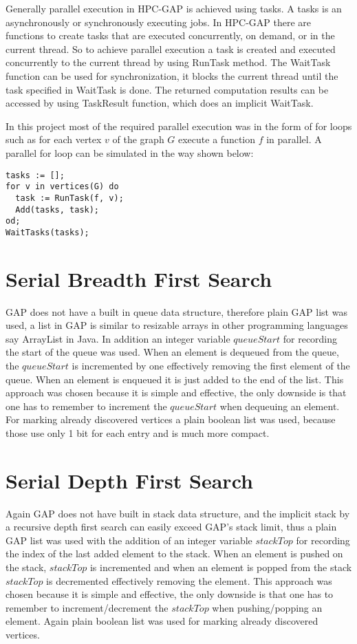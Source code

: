 \documentclass{report}
\theoremstyle{plain}
\theoremstyle{definition}
\theoremstyle{remark}
\begin{document}
Generally parallel execution in HPC-GAP is achieved using tasks. A tasks is an asynchronously or synchronously executing jobs. In HPC-GAP there are functions to create tasks that are executed concurrently, on demand, or in the current thread. So to achieve parallel execution a task is created and executed concurrently to the current thread by using RunTask method. The WaitTask function can be used for synchronization, it blocks the current thread until the task specified in WaitTask is done. The returned computation results can be accessed by using TaskResult function, which does an implicit WaitTask.

In this project most of the required parallel execution was in the form of for loops such as for each vertex $v$ of the graph $G$ execute a function $f$ in parallel. A parallel for loop can be simulated in the way shown below:

\begin{lstlisting}
tasks := [];
for v in vertices(G) do
  task := RunTask(f, v);
  Add(tasks, task);
od;
WaitTasks(tasks);
\end{lstlisting}

\section{Serial Breadth First Search}

GAP does not have a built in queue data structure, therefore plain GAP list was used, a list in GAP is similar to resizable arrays in other programming languages say ArrayList in Java. In addition an integer variable $queueStart$ for recording the start of the queue was used. When an element is dequeued from the queue, the $queueStart$ is incremented by one effectively removing the first element of the queue. When an element is enqueued it is just added to the end of the list. This approach was chosen because it is simple and effective, the only downside is that one has to remember to increment the $queueStart$ when dequeuing an element. For marking already discovered vertices a plain boolean list was used, because those use only 1 bit for each entry and is much more compact.

\section{Serial Depth First Search}

Again GAP does not have built in stack data structure, and the implicit stack by a recursive depth first search can easily exceed GAP's stack limit, thus a plain GAP list was used with the addition of an integer variable $stackTop$ for recording the index of the last added element to the stack. When an element is pushed on the stack, $stackTop$ is incremented and when an element is popped from the stack $stackTop$ is decremented effectively removing the element. This approach was chosen because it is simple and effective, the only downside is that one has to remember to increment/decrement the $stackTop$ when pushing/popping an element. Again plain boolean list was used for marking already discovered vertices.
\end{document}
